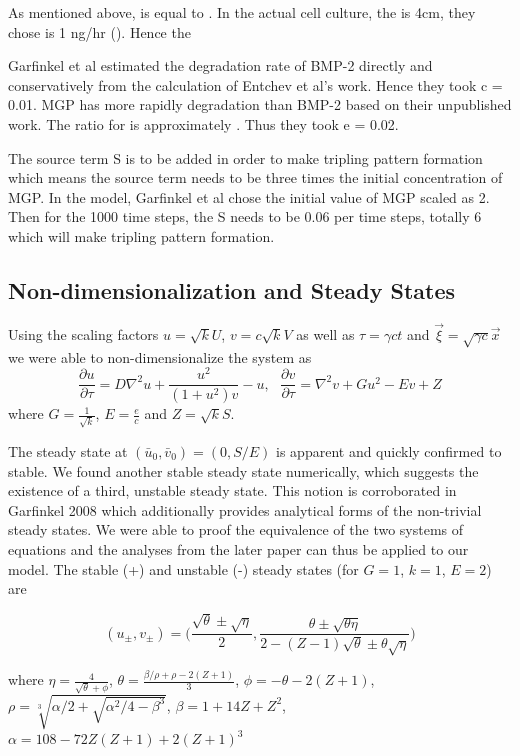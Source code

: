 \documentclass[12pt]{article}
\begin{document}
  As mentioned above,  is equal to . In the actual cell culture, the is 4cm,  they chose is 1 ng/hr (). Hence the 
  
  Garfinkel et al estimated the degradation rate of BMP-2 directly and conservatively from the calculation of Entchev et al’s work. Hence they took c = 0.01. MGP has more rapidly degradation than BMP-2 based on their unpublished work. The ratio for  is approximately . Thus they took e = 0.02.
  
  The source term S is to be added in order to make tripling pattern formation which means the source term needs to be three times the initial concentration of MGP. In the model, Garfinkel et al chose the initial value of MGP scaled as 2. Then for the 1000 time steps, the S needs to be 0.06 per time steps, totally 6 which will make tripling pattern formation.
  
  \subsection{Non-dimensionalization and Steady States}
  
  Using the scaling factors $u=\sqrt{k}U$, $v=c\sqrt{k}V$ as well as $\tau = \gamma c t$ and $\vec{\xi}=\sqrt{\gamma c} \vec{x}$ we were able to non-dimensionalize the system as
  $$\frac{\partial u}{\partial \tau} = D\nabla^2 u + \frac{u^2}{(1+u^2)v}-u,\ \ \ \frac{\partial v}{\partial \tau} = \nabla^2 v + G u^2 - E v + Z$$
  where $G=\frac{1}{\sqrt{k}}$, $E=\frac{e}{c}$ and $Z=\sqrt{k}S$.
  
  
  The steady state at $(\bar u_0,\bar v_0)=(0,S/E)$ is apparent and quickly confirmed to stable. We found another stable steady state numerically, which suggests the existence of a third, unstable steady state.
  This notion is corroborated in Garfinkel 2008 which additionally provides analytical forms of the non-trivial steady states. We were able to proof the equivalence of the two systems of equations and the analyses from the later paper can thus be applied to  our model. The stable (+) and unstable (-) steady states (for $G=1$, $k=1$, $E=2$) are
  
  $$(u_\pm,v_\pm)=\Bigg(\frac{\sqrt{\theta}\pm\sqrt{\eta}}{2}, \frac{\theta\pm\sqrt{\theta\eta}}{2-(Z-1)\sqrt{\theta}\pm\theta\sqrt{\eta}}\Bigg)$$
  
  where $\eta = \frac{4}{\sqrt{\theta}+\phi}$, $\theta=\frac{\beta/\rho+\rho-2(Z+1)}{3}$, $\phi = -\theta-2(Z+1)$, $\rho = \sqrt[3]{\alpha/2+\sqrt{\alpha^2/4-\beta^3}}$, $\beta = 1+14Z+Z^2$, $\alpha = 108-72Z(Z+1)+2(Z+1)^3$
  
\end{document}
